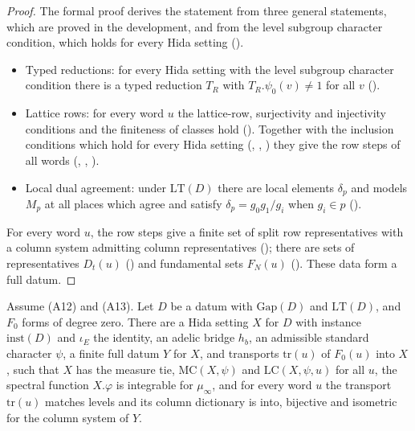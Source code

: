 \begin{proof}
The formal proof derives the statement from three general statements, which are proved in the development, and
from the level subgroup character condition, which holds for every Hida setting
().
\begin{itemize}
\item Typed reductions: for every Hida setting with the level subgroup character condition there is a typed
  reduction $T_R$ with $T_R.\psi_0(v)\ne1$ for all $v$ ().
\item Lattice rows: for every word $u$ the lattice-row, surjectivity and injectivity conditions and the finiteness of
  classes hold (). Together with the inclusion conditions which hold
  for every Hida setting (, ,
  ) they give the row steps of all words
  (, ,
  ).
\item Local dual agreement: under $\mathrm{LT}(D)$ there are local elements $\delta_p$ and models $M_p$ at all places which
  agree and satisfy $\delta_p=g_0g_1/g_i$ when $g_i\in p$ ().
\end{itemize}
For every word $u$, the row steps give a finite set of split row representatives with a column system admitting column
representatives (); there are sets of representatives $D_t(u)$
() and fundamental sets $F_N(u)$ ().
These data form a full datum.
\end{proof}

\begin{theorem}\label{pf:baselat1:specgap}
Assume (A12) and (A13). Let $D$ be a datum with $\mathrm{Gap}(D)$ and $\mathrm{LT}(D)$, and $F_0$ forms of degree zero.
There are a Hida setting $X$ for $D$ with instance $\mathrm{inst}(D)$ and $\iota_E$ the identity, an adelic bridge $h_b$, an
admissible standard character $\psi$, a finite full datum $Y$ for $X$, and transports $\mathrm{tr}(u)$ of $F_0(u)$ into $X$,
such that $X$ has the measure tie, $\mathrm{MC}(X,\psi)$ and $\mathrm{LC}(X,\psi,u)$ for all $u$, the spectral function
$X.\varphi$ is integrable for $\mu_\infty$, and for every word $u$ the transport $\mathrm{tr}(u)$ matches levels and
its column dictionary is into, bijective and isometric for the column system of $Y$.
\end{theorem}


